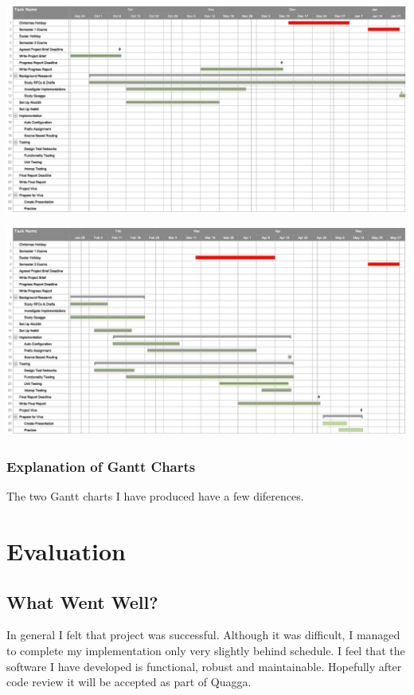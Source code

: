 \documentclass[12pt]{report}
\begin{document}
\begin{landscape}
\begin{center}
  \includegraphics[width=\linewidth]{../Gantt/FinalGanttPt1.png}
\end{center}

\begin{center}
  \includegraphics[width=\linewidth]{../Gantt/FinalGanttPt2.png}
\end{center}

\end{landscape}

\pagebreak

\subsection{Explanation of Gantt Charts}
The two Gantt charts I have produced have a few diferences. 


\chapter{Evaluation}

\section{What Went Well?}
In general I felt that project was successful. Although it was difficult, I
managed to complete my implementation only very slightly behind schedule. I
feel that the software I have developed is functional, robust and maintainable.
Hopefully after code review it will be accepted as part of Quagga.
\end{document}
